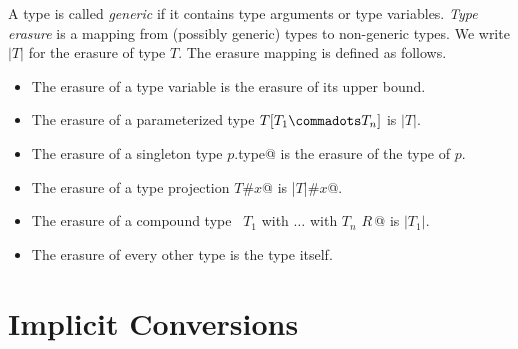 \documentclass[a4paper,12pt,twoside,titlepage]{book}
\begin{document}
A type is called {\em generic} if it contains type arguments or type variables.
{\em Type erasure} is a mapping from (possibly generic) types to
non-generic types. We write $|T|$ for the erasure of type $T$.
The erasure mapping is defined as follows.
\begin{itemize}
\item The erasure of a type variable is the erasure of its upper bound.
\item The erasure of a parameterized type $T[T_1 \commadots T_n]$ is $|T|$.
\item The erasure of a singleton type \lstinline@$p$.type@ is the 
      erasure of the type of $p$.
\item The erasure of a type projection \lstinline@$T$#$x$@ is \lstinline@|$T$|#$x$@.
\item The erasure of a compound type ~\lstinline@$T_1$ with $\ldots$ with $T_n$ {$R\,$}@ 
      is $|T_1|$.
\item The erasure of every other type is the type itself.
\end{itemize}

\section{Implicit Conversions}
\label{sec:impl-conv}
\end{document}
